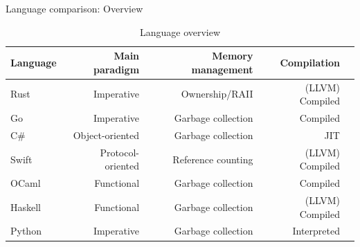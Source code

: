 \documentclass[NET,english,aspectratio=169,notitleframe]{tumbeamer}
\begin{document}
\begin{frame}{Language comparison: Overview}
\begin{table}[t]
 \setlength{\tabcolsep}{2mm}
	\centering
	\footnotesize
	\begin{tabular}{lrrrr}
		\textbf{Language} & \textbf{Main paradigm} & \textbf{Memory management} & \textbf{Compilation} \\
		\toprule
		Rust & Imperative & Ownership/RAII & (LLVM) Compiled \\
		Go & Imperative & Garbage collection & Compiled \\
		C\# & Object-oriented & Garbage collection & JIT \\
		Swift & Protocol-oriented & Reference counting & (LLVM) Compiled \\
		OCaml & Functional & Garbage collection & Compiled \\
		Haskell & Functional & Garbage collection & (LLVM) Compiled \\
		Python & Imperative & Garbage collection & Interpreted \\
		\bottomrule
	\end{tabular}
	\caption{Language overview}
	\label{tbl:languages}
\end{table}
\end{frame}
\end{document}
